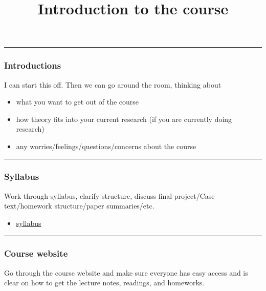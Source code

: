 \documentclass[
]{article}
\title{Introduction to the course}
\author{}
\date{\vspace{-2.5em}}
\providecommand{\tightlist}{%
  \setlength{\itemsep}{0pt}\setlength{\parskip}{0pt}}
\begin{document}
\maketitle

\begin{center}\rule{0.5\linewidth}{0.5pt}\end{center}

\hypertarget{introductions}{%
\subsubsection{Introductions}\label{introductions}}

I can start this off. Then we can go around the room, thinking about

\begin{itemize}
\tightlist
\item
  what you want to get out of the course
\item
  how theory fits into your current research (if you are currently doing
  research)
\item
  any worries/feelings/questions/concerns about the course
\end{itemize}

\begin{center}\rule{0.5\linewidth}{0.5pt}\end{center}

\hypertarget{syllabus}{%
\subsubsection{Syllabus}\label{syllabus}}

Work through syllabus, clarify structure, discuss final project/Case
text/homework structure/paper summaries/etc.

\begin{itemize}
\tightlist
\item
  \href{https://theoreticalEcology.github.io/syllabus/}{syllabus}
\end{itemize}

\begin{center}\rule{0.5\linewidth}{0.5pt}\end{center}

\hypertarget{course-website}{%
\subsubsection{Course website}\label{course-website}}

Go through the course website and make sure everyone has easy access and
is clear on how to get the lecture notes, readings, and homeworks.
\end{document}
